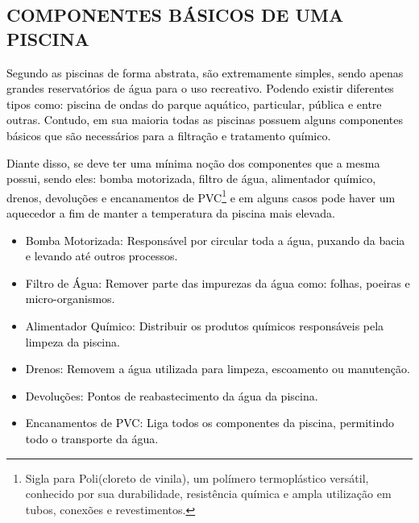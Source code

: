     \subsection{COMPONENTES BÁSICOS DE UMA PISCINA}
        
        \textcolor{black}{Segundo \cite{refComponents} as piscinas de forma abstrata, são extremamente simples, sendo apenas grandes reservatórios de água para o uso recreativo. Podendo existir diferentes tipos como: piscina de ondas do parque aquático, particular, pública e entre outras. Contudo, em sua maioria todas as piscinas possuem alguns componentes básicos que são necessários para a filtração e tratamento químico.}

        \textcolor{black}{Diante disso, se deve ter uma mínima noção dos componentes que a mesma possui, sendo eles: bomba motorizada, filtro de água, alimentador químico, drenos, devoluções e encanamentos de PVC\footnote{Sigla para Poli(cloreto de vinila), um polímero termoplástico versátil, conhecido por sua durabilidade, resistência química e ampla utilização em tubos, conexões e revestimentos.} e em alguns casos pode haver um aquecedor a fim de manter a temperatura da piscina mais elevada.}

        \begin{itemize}
        
            \item \textcolor{black}{Bomba Motorizada:}
                \textcolor{black}{Responsável por circular toda a água, puxando da bacia e levando até outros processos.}

            \item \textcolor{black}{Filtro de Água:}
                \textcolor{black}{Remover parte das impurezas da água como: folhas, poeiras e micro-organismos.}

            \item \textcolor{black}{Alimentador Químico:}
                \textcolor{black}{Distribuir os produtos químicos responsáveis pela limpeza da piscina.}

            \item \textcolor{black}{Drenos:}
                \textcolor{black}{Removem a água utilizada para limpeza, escoamento ou manutenção.}

            \item \textcolor{black}{Devoluções:}
                \textcolor{black}{Pontos de reabastecimento da água da piscina.}

            \item \textcolor{black}{Encanamentos de PVC:}
                \textcolor{black}{Liga todos os componentes da piscina, permitindo todo o transporte da água.}
                
        \end{itemize}

